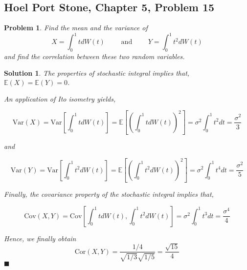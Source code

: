 \documentclass[12pt]{article}
\theoremstyle{problemstyle}
\newtheorem{pbm}{Problem}
\newtheorem*{solution*}{Solution}
\newenvironment{problem}{
\begin{tcolorbox}[colback=green!10!white,colframe=black!75!black, parbox = false]\begin{pbm} }{\end{pbm}\end{tcolorbox} }
\newcommand{\E}{\mathbb{E}}
\newcommand{\Var}{\text{Var}}
\newcommand{\Cov}{\text{Cov}}
\begin{document}
\newpage 



\subsection{Hoel Port Stone, Chapter 5, Problem 15}
\begin{problem}
Find the mean and the variance of 
$$
X = \int_0^1 t dW(t) \qquad \text{ and } \qquad Y = \int_0^1 t^2 dW(t)
$$
\noindent and find the correlation between these two random variables.
\end{problem}
\begin{solution*}

The properties of stochastic integral implies that, $\E(X) = \E(Y) = 0$.

An application of Ito isometry yields, 

$$
\Var(X) = \Var\left[ \int_0^1 t dW(t) \right] = \E\left[ \left(\int_0^1 t dW(t)\right)^2 \right] = \sigma^2 \int_0^1 t^2 dt = \dfrac{\sigma^2}{3}
$$

\noindent and

$$
\Var(Y) = \Var\left[ \int_0^1 t^2 dW(t) \right] = \E\left[ \left(\int_0^1 t^2 dW(t)\right)^2 \right] = \sigma^2 \int_0^1 t^4 dt = \dfrac{\sigma^2}{5}
$$

\noindent Finally, the covariance property of the stochastic integral implies that,

$$\Cov(X, Y) = \Cov\left[ \int_0^1 t dW(t), \int_0^1 t^2 dW(t) \right] = \sigma^2 \int_0^1 t^3 dt = \dfrac{\sigma^4}{4}$$

Hence, we finally obtain $$\boxed{\text{Cor}(X, Y) = \dfrac{1/4}{\sqrt{1/3}\sqrt{1/5}} = \dfrac{\sqrt{15}}{4}}$$ \hfill $\blacksquare$



\end{solution*}

\newpage 

\end{document}
